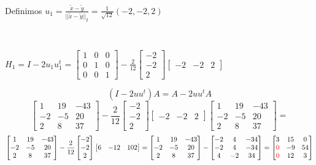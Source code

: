\noindent Definimos $u_1 = \frac{\tilde{x} - \tilde{y}}{{||\tilde{x}- \tilde{y}||}_{2}} = \frac{1}{\sqrt{12}}(-2,-2,2)$

\

$H_1 = I - 2u_{1}u_{1}^{t} = \begin{bmatrix}
1 & 0 & 0 \\
0 & 1 & 0 \\
0 & 0 & 1
\end{bmatrix} - \frac{2}{12} \begin{bmatrix}
    -2 \\ -2 \\ 2
\end{bmatrix} \begin{bmatrix}
    -2 & -2 & 2
\end{bmatrix}$

\[(I - 2uu^{t})A = A - 2uu^t A\]
\[
    \begin{bmatrix}
    1 & 19 & -43 \\
    -2 & -5 & 20 \\
    2 & 8 & 37
\end{bmatrix} - \frac{2}{12}\begin{bmatrix}
    -2 \\ -2 \\ 2
\end{bmatrix} \begin{bmatrix}
    -2 & -2 & 2
\end{bmatrix} \begin{bmatrix}
    1 & 19 & -43 \\
    -2 & -5 & 20 \\
    2 & 8 & 37
\end{bmatrix} =
\]
\[
\begin{bmatrix}
    1 & 19 & -43 \\
    -2 & -5 & 20 \\
    2 & 8 & 37
\end{bmatrix} - \frac{2}{12}\begin{bmatrix}
    -2 \\ -2 \\ 2
\end{bmatrix} \begin{bmatrix}
    6 & -12 & 102 
\end{bmatrix} =
\begin{bmatrix}
    1 & 19 & -43 \\
    -2 & -5 & 20 \\
    2 & 8 & 37
\end{bmatrix} - \begin{bmatrix}
    -2 & 4 & -34 \\
    -2 & 4 & -34 \\
    4 & -2 & 34 \\
\end{bmatrix}  = \begin{bmatrix}
    3 & 15 & 0 \\
    \textcolor{red}{0} & -9 & 54 \\
    \textcolor{red}{0} & 12 & 3
\end{bmatrix} 
\]

